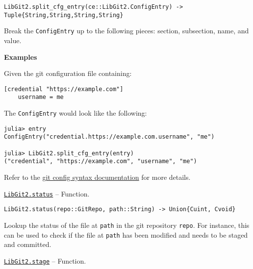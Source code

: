 \begin{adjustwidth}{2em}{0pt}


\begin{verbatim}
LibGit2.split_cfg_entry(ce::LibGit2.ConfigEntry) -> Tuple{String,String,String,String}
\end{verbatim}

Break the \texttt{ConfigEntry} up to the following pieces: section, subsection, name, and value.

\textbf{Examples}

Given the git configuration file containing:


\begin{lstlisting}
[credential "https://example.com"]
    username = me
\end{lstlisting}

The \texttt{ConfigEntry} would look like the following:


\begin{verbatim}
julia> entry
ConfigEntry("credential.https://example.com.username", "me")

julia> LibGit2.split_cfg_entry(entry)
("credential", "https://example.com", "username", "me")
\end{verbatim}

Refer to the \href{https://git-scm.com/docs/git-config\#\_syntax}{git config syntax documentation} for more details.



\end{adjustwidth}
\hypertarget{8948863044724673987}{}
\hyperlink{8948863044724673987}{\texttt{LibGit2.status}}  -- {Function.}

\begin{adjustwidth}{2em}{0pt}


\begin{verbatim}
LibGit2.status(repo::GitRepo, path::String) -> Union{Cuint, Cvoid}
\end{verbatim}

Lookup the status of the file at \texttt{path} in the git repository \texttt{repo}. For instance, this can be used to check if the file at \texttt{path} has been modified and needs to be staged and committed.



\end{adjustwidth}
\hypertarget{3859390867093299114}{}
\hyperlink{3859390867093299114}{\texttt{LibGit2.stage}}  -- {Function.}

